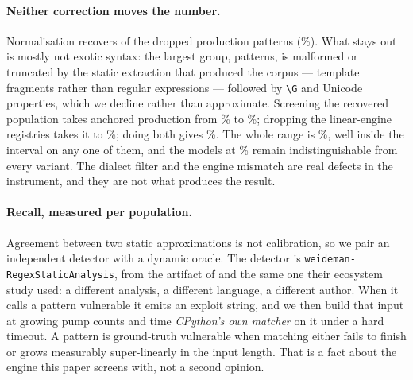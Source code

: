 \documentclass[11pt]{article}
\begin{document}
\paragraph{Neither correction moves the number.} Normalisation recovers
\recovered{} of the \proddropped{} dropped production patterns
(\recoveredpct{}\%). What stays out is mostly not exotic syntax: the largest
group, \topunrecoveredn{} patterns, is malformed or truncated by the static
extraction that produced the corpus --- template fragments rather than
regular expressions --- followed by \texttt{\textbackslash G} and Unicode
properties, which we decline rather than approximate. Screening the recovered
population takes anchored
production from \anchoredprod{}\% to \robnorm{}\%; dropping the linear-engine
registries takes it to \robbt{}\%; doing both gives \robboth{}\%. The whole
range is \robrange{}\%, well inside the interval on any one of them, and the
models at \anchoredmodels{}\% remain indistinguishable from every variant.
The dialect filter and the engine mismatch are real defects in the
instrument, and they are not what produces the result.

\paragraph{Recall, measured per population.} Agreement between two static
approximations is not calibration, so we pair an independent detector with a
dynamic oracle. The detector is
\texttt{weideman-RegexStaticAnalysis}, from the artifact of
\citet{davis2019linguafranca} and the same one their ecosystem study used: a
different analysis, a different language, a different author. When it calls a
pattern vulnerable it emits an exploit string, and we then build that input at
growing pump counts and time \emph{CPython's own matcher} on it under a hard
timeout. A pattern is ground-truth vulnerable when matching either fails to
finish or grows measurably super-linearly in the input length. That is a fact
about the engine this paper screens with, not a second opinion.

\begin{table}[htbp]
\centering
\footnotesize
\setlength{\tabcolsep}{4pt}

\caption{Screen sensitivity per population. \emph{Unanalysable} counts
patterns the independent detector skipped or timed out on, which are neither
evidence for nor against. \emph{Caught/confirmed} is our screen's hits over
the patterns the detector flagged \emph{and} a timing measurement then
confirmed blow up under CPython. Recall is measured against what the detector
finds, so it is a relative sensitivity rather than an absolute one --- which
is what the cross-population comparison needs, since the question is whether
the instrument is equally blind everywhere and not how blind it is. The
intervals are wide because dynamically confirmed vulnerabilities are scarce
in a sample of a few hundred; they are given so that the comparison is read
at the precision the counts support.}
\label{tab:calibration}
\end{table}
\end{document}
